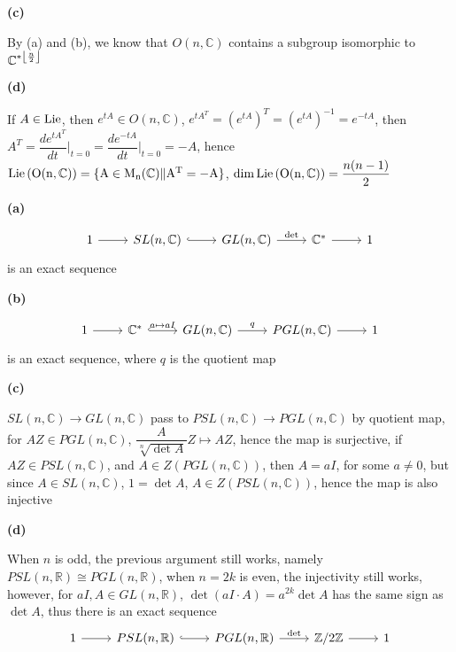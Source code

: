 \documentclass[main]{subfiles}
\begin{document}
\textbf{(c)} \par
By (a) and (b), we know that $O(n,\mathbb{C})$ contains a subgroup isomorphic to $\mathbb{C}^{*\left\lfloor \frac{n}{2} \right\rfloor}$ \par
\textbf{(d)} \par
If $A\in\rm{Lie}$, then $e^{tA}\in O(n,\mathbb{C})$, $e^{tA^T}=\left(e^{tA}\right)^T=\left(e^{tA}\right)^{-1}=e^{-tA}$, then $A^T=\dfrac{de^{tA^T}}{dt}\left.\right|_{t=0}=\dfrac{de^{-tA}}{dt}\left.\right|_{t=0}=-A$, hence $\rm{Lie}\left(O(n,\mathbb{C})\right)=\{A\in M_n(\mathbb{C})\|A^T=-A\}$, $\dim{\rm{Lie}\left(O(n,\mathbb{C})\right)}=\dfrac{n(n-1)}{2}$ \par

\begin{exercise}
\begin{enumerate}[label=(\alph*),leftmargin=*]

\end{enumerate}
\end{exercise}

\textbf{(a)} \par
$$
\begin{tikzcd}
1 \arrow[r] & {SL(n,\mathbb{C})} \arrow[r, hook] & {GL(n,\mathbb{C})} \arrow[r, "\det"] & \mathbb{C}^* \arrow[r] & 1
\end{tikzcd}
$$ is an exact sequence \par
\textbf{(b)} \par
$$
\begin{tikzcd}
1 \arrow[r] & \mathbb{C}^* \arrow[r, "a\mapsto aI", hook] & {GL(n,\mathbb{C})} \arrow[r, "q"] & {PGL(n,\mathbb{C})} \arrow[r] & 1
\end{tikzcd}
$$ is an exact sequence, where $q$ is the quotient map \par
\textbf{(c)} \par
$SL(n,\mathbb{C})\rightarrow GL(n,\mathbb{C})$ pass to $PSL(n,\mathbb{C})\rightarrow PGL(n,\mathbb{C})$ by quotient map, for $AZ\in PGL(n,\mathbb{C})$, $\dfrac{A}{\sqrt[n]{\det A}}Z\mapsto AZ$, hence the map is surjective, if $AZ\in PSL(n,\mathbb{C})$, and $A\in Z(PGL(n,\mathbb{C}))$, then $A=aI$, for some $a\neq0$, but since $A\in SL(n,\mathbb{C})$, $1=\det A$, $A\in Z(PSL(n,\mathbb{C}))$, hence the map is also injective \par
\textbf{(d)} \par
When $n$ is odd, the previous argument still works, namely $PSL(n,\mathbb{R})\cong PGL(n,\mathbb{R})$, when $n=2k$ is even, the injectivity still works, however, for $aI,A\in GL(n,\mathbb{R})$, $\det (aI\cdot A)=a^{2k}\det A$ has the same sign as $\det A$, thus there is an exact sequence 
$$
\begin{tikzcd}
1 \arrow[r] & {PSL(n,\mathbb{R})} \arrow[r, hook] & {PGL(n,\mathbb{R})} \arrow[r, "\det"] & \mathbb{Z}/2\mathbb{Z} \arrow[r] & 1
\end{tikzcd}
$$
\end{document}
